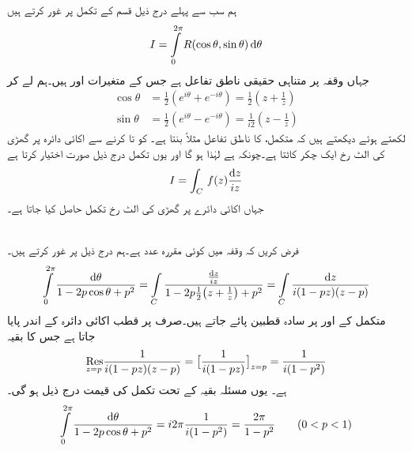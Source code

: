 ہم سب سے پہلے درج ذیل قسم کے تکمل پر غور کرتے ہیں
\begin{align}\label{مساوات_بقیہ_حقیقی_تکمل_الف}
I=\int\limits_{0}^{2\pi} R(\cos \theta,\sin\theta)\dif \theta
\end{align}
جہاں  وقفہ  پر متناہی حقیقی ناطق تفاعل  ہے جس کے متغیرات  اور  ہیں۔ہم  لے کر
\begin{align*}
\cos\theta&=\frac{1}{2}(e^{i\theta}+e^{-i\theta})=\frac{1}{2}(z+\frac{1}{z})\\
\sin\theta&=\frac{1}{2}(e^{i\theta}-e^{-i\theta})=\frac{1}{i2}(z-\frac{1}{z})
\end{align*}
لکھتے ہوئے دیکھتے ہیں کہ متکمل،  کا ناطق تفاعل مثلاً  بنتا ہے۔ کو   تا  کرنے سے  اکائی دائرہ  پر گھڑی کی الٹ رخ ایک چکر کاٹتا ہے۔چونکہ  ہے لہٰذا  ہو گا اور یوں تکمل درج ذیل صورت اختیار کرتا ہے
\begin{align}\label{مساوات_بقیہ_حقیقی_تکمل_ب}
I=\int_C\,f(z)\frac{\dif z}{iz}
\end{align}
جہاں اکائی دائرے پر گھڑی کی الٹ رخ تکمل حاصل کیا جاتا ہے۔

\quad {}\\
فرض کریں کہ  وقفہ  میں کوئی مقررہ عدد ہے۔ہم درج ذیل پر غور کرتے ہیں۔
\begin{align*}
\int\limits_0^{2\pi}\frac{\dif \theta}{1-2p\cos\theta+p^2}=\int\limits_C\frac{\frac{\dif z}{iz}}{1-2p\frac{1}{2}\big(z+\frac{1}{z}\big)+p^2}=\int\limits_C \frac{\dif z}{i(1-pz)(z-p)}
\end{align*}
متکمل کے  اور  پر سادہ قطبین پائے جاتے ہیں۔صرف  پر قطب اکائی دائرہ  کے اندر پایا جاتا ہے جس کا بقیہ
\begin{align*}
\underset{z=p\hfill}{\Res} \frac{1}{i(1-pz)(z-p)}=\big[\frac{1}{i(1-pz)}\big]_{z=p}=\frac{1}{i(1-p^2)}
\end{align*}
ہے۔ یوں مسئلہ بقیہ کے تحت تکمل کی قیمت درج ذیل ہو گی۔
\begin{align*}
\int\limits_0^{2\pi}\frac{\dif \theta}{1-2p\cos\theta+p^2}=i2\pi\frac{1}{i(1-p^2)}=\frac{2\pi}{1-p^2}\quad \quad (0<p<1)
\end{align*}

